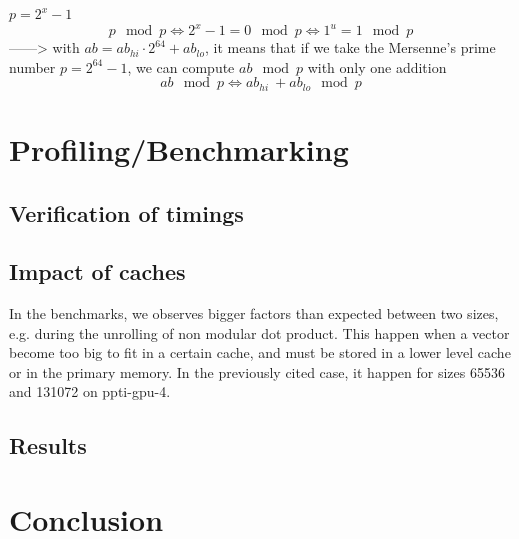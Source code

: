 \documentclass[a4paper]{article}
\begin{document}
$p = 2^x - 1$
\[
p \mod p \Longleftrightarrow 2^x - 1 = 0 \mod p \Longleftrightarrow 1^u = 1 \mod p
\]
------> with $ab = ab_{hi}\cdot 2^{64} + ab_{lo}$, it means that if we take the Mersenne's prime number $p = 2^{64} - 1$, we can compute $ab \mod p$ with only one addition 
\[
    ab \mod p \Longleftrightarrow ab_{hi}\ + ab_{lo} \mod p
\]



\section{Profiling/Benchmarking}



\subsection{Verification of timings}

\subsection{Impact of caches} %

In the benchmarks, we observes bigger factors than expected between two sizes,
e.g. during the unrolling of non modular dot product. This happen when a vector
become too big to fit in a certain cache, and must be stored in a lower level
cache or in the primary memory. In the previously cited case, it happen for sizes
65536 and 131072 on ppti-gpu-4. %


\subsection{Results}

\section{Conclusion}



\newpage
 
 
\nocite{*}
\end{document}
